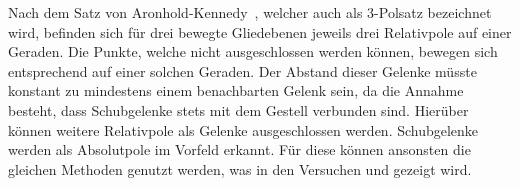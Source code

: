 Nach dem Satz von Aronhold-Kennedy~\cite{Goessner2016, Kerle2016}, welcher auch als 3-Polsatz bezeichnet wird, befinden sich für drei bewegte Gliedebenen jeweils drei Relativpole auf einer Geraden.
Die Punkte, welche nicht ausgeschlossen werden können, bewegen sich entsprechend auf einer solchen Geraden.
Der Abstand dieser Gelenke müsste konstant zu mindestens einem benachbarten Gelenk sein, da die Annahme besteht, dass Schubgelenke stets mit dem Gestell verbunden sind.
Hierüber können weitere Relativpole als Gelenke ausgeschlossen werden.
Schubgelenke werden als Absolutpole im Vorfeld erkannt.
Für diese können ansonsten die gleichen Methoden genutzt werden, was in den Versuchen  und  gezeigt wird.
